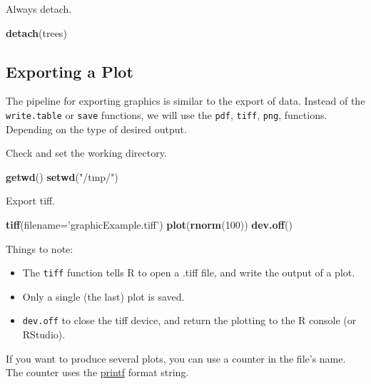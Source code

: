 \documentclass[]{book}
\newenvironment{Shaded}{\begin{snugshade}}{\end{snugshade}}
\newcommand{\KeywordTok}[1]{\textcolor[rgb]{0.13,0.29,0.53}{\textbf{#1}}}
\newcommand{\DataTypeTok}[1]{\textcolor[rgb]{0.13,0.29,0.53}{#1}}
\newcommand{\DecValTok}[1]{\textcolor[rgb]{0.00,0.00,0.81}{#1}}
\newcommand{\StringTok}[1]{\textcolor[rgb]{0.31,0.60,0.02}{#1}}
\newcommand{\NormalTok}[1]{#1}
\providecommand{\tightlist}{%
  \setlength{\itemsep}{0pt}\setlength{\parskip}{0pt}}
\theoremstyle{definition}
\theoremstyle{definition}
\theoremstyle{definition}
\theoremstyle{remark}
\begin{document}
Always detach.

\begin{Shaded}
\begin{Highlighting}[]
\KeywordTok{detach}\NormalTok{(trees)}
\end{Highlighting}
\end{Shaded}

\subsection{Exporting a Plot}\label{exporting-a-plot}

The pipeline for exporting graphics is similar to the export of data.
Instead of the \texttt{write.table} or \texttt{save} functions, we will
use the \texttt{pdf}, \texttt{tiff}, \texttt{png}, functions. Depending
on the type of desired output.

Check and set the working directory.

\begin{Shaded}
\begin{Highlighting}[]
\KeywordTok{getwd}\NormalTok{()}
\KeywordTok{setwd}\NormalTok{(}\StringTok{"/tmp/"}\NormalTok{)}
\end{Highlighting}
\end{Shaded}

Export tiff.

\begin{Shaded}
\begin{Highlighting}[]
\KeywordTok{tiff}\NormalTok{(}\DataTypeTok{filename=}\StringTok{'graphicExample.tiff'}\NormalTok{)}
\KeywordTok{plot}\NormalTok{(}\KeywordTok{rnorm}\NormalTok{(}\DecValTok{100}\NormalTok{))}
\KeywordTok{dev.off}\NormalTok{()}
\end{Highlighting}
\end{Shaded}

Things to note:

\begin{itemize}
\tightlist
\item
  The \texttt{tiff} function tells R to open a .tiff file, and write the
  output of a plot.
\item
  Only a single (the last) plot is saved.
\item
  \texttt{dev.off} to close the tiff device, and return the plotting to
  the R console (or RStudio).
\end{itemize}

If you want to produce several plots, you can use a counter in the
file's name. The counter uses the
\href{https://en.wikipedia.org/wiki/Printf_format_string}{printf} format
string.
\end{document}
